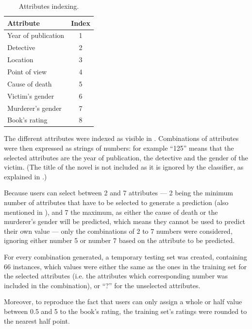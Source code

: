 \documentclass{mproj}
\begin{document}
\begin{table}
	\centering
	\caption{Attributes indexing.}
	\begin{tabular}{ |l|c| }
		\hline
		\textbf{Attribute}   		& \textbf{Index}\\
		\hline		
		Year of publication         & 1    			\\ 
		Detective                   & 2				\\ Location                  	& 3				\\
		Point of view               & 4				\\
		Cause of death              & 5				\\
		Victim's gender             & 6				\\
		Murderer's gender           & 7				\\
		Book's rating               & 8				\\
		\hline
	\end{tabular}
	\label{tab:attribute}
\end{table}

The different attributes were indexed as visible in . Combinations of attributes were then expressed as strings of numbers: for example ``125'' means that the selected attributes are the year of publication, the detective and the gender of the victim. (The title of the novel is not included as it is ignored by the classifier, as explained in .)

Because users can select between 2 and 7 attributes --- 2 being the minimum number of attributes that have to be selected to generate a prediction (also mentioned in ), and 7 the maximum, as either the cause of death or the murderer's gender will be predicted, which means they cannot be used to predict their own value --- only the combinations of 2 to 7 numbers were considered, ignoring either number 5 or number 7 based on the attribute to be predicted.

For every combination generated, a temporary testing set was created, containing 66 instances, which values were either the same as the ones in the training set for the selected attributes (i.e. the attributes which corresponding number was included in the combination), or ``?'' for the unselected attributes.

Moreover, to reproduce the fact that users can only assign a whole or half value between 0.5 and 5 to the book's rating, the training set's ratings were rounded to the nearest half point.
\end{document}
